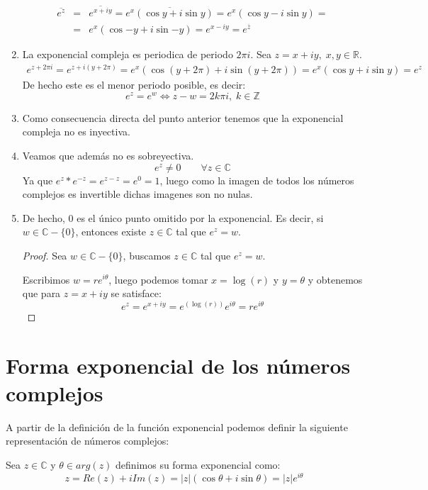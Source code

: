 \begin{enumerate}
    \begin{eqnarray*}
      \overline{e^z} & = & \overline{e^{x+iy}} = \overline{e^x(\cos{y}+i\sin{y})} = e^x(\cos{y}-i\sin{y}) = \\
                     & = & e^x(\cos{-y}+i\sin{-y}) = e^{x-iy} = e^{\overline{z}}
    \end{eqnarray*}
  \item La exponencial compleja es periodica de periodo \(2 \pi i \). Sea \(z=x+iy, \; x,y\in \mathbb{R}\).
    \begin{eqnarray*}
      e^{z+2\pi i} = e^{z+i(y+2\pi)} = e^x(\cos(y+2\pi)+i\sin(y+2\pi)) = e^x(\cos{y}+i\sin{y}) = e^z
    \end{eqnarray*}
    De hecho este es el menor periodo posible, es decir:
    \[e^z=e^w \Leftrightarrow z-w=2k\pi i, \; k\in \mathbb{Z}\]
  \item Como consecuencia directa del punto anterior tenemos que la exponencial compleja no es inyectiva.
  \item Veamos que además no es sobreyectiva.
    \[e^z \neq 0 \qquad \forall z \in \mathbb{C}\]
    Ya que \(e^z*e^{-z} = e^{z-z} = e^0 = 1\), luego como la imagen de todos los números complejos es invertible dichas imagenes son no nulas.
  \item De hecho, 0 es el único punto omitido por la exponencial. Es decir, si \(w\in \mathbb{C}-\{0\}\), entonces existe \(z\in \mathbb{C}\) tal que \(e^z=w\).
    \begin{proof}
      Sea \(w\in \mathbb{C}-\{0\}\), buscamos \(z\in \mathbb{C}\) tal que \(e^z=w\).

      Escribimos \(w=re^{i\theta}\), luego podemos tomar \(x=\log(r)\) y \(y=\theta\) y obtenemos que para \(z=x+iy\) se satisface:
      \[e^z=e^{x+iy}=e^(\log(r))e^{i\theta}=re^{i\theta}\]
    \end{proof}
\end{enumerate}

\section{Forma exponencial de los números complejos}

A partir de la definición de la función exponencial podemos definir la siguiente representación de números complejos:

\begin{definicion} 
  Sea \(z\in \mathbb{C}\)  y \(\theta \in arg(z)\) definimos su forma exponencial como:
  \[z = Re(z)+iIm(z)=|z|(\cos \theta + i\sin \theta) = |z|e^{i\theta}\] 
\end{definicion}

